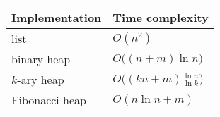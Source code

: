
\begin{tabular}{ll} \hline
Implementation & Time complexity \\\hline
list           & $O(n^2)$ \\
binary heap    & $O \big( (n + m) \ln n \big)$ \\
$k$-ary heap   & $O \big( (kn + m) \frac{\ln n}{\ln k} \big)$ \\
Fibonacci heap & $O(n \ln n + m)$ \\\hline
\end{tabular}
